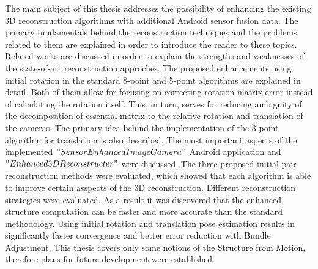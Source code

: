 


\begin{abstracts}        %

The main subject of this thesis addresses the possibility of enhancing the existing 3D reconstruction algorithms with additional Android sensor fusion data. The primary fundamentals behind the reconstruction techniques and the problems related to them are explained in order to introduce the reader to these topics. Related works are discussed in order to explain the strengths and weaknesses of the state-of-art reconstruction approches. The proposed enhancements using initial rotation in the standard 8-point and 5-point algorithms are explained in detail. Both of them allow for focusing on correcting rotation matrix error instead of calculating the rotation itself. This, in turn, serves for reducing ambiguity of the decomposition of essential matrix to the relative rotation and translation of the cameras. The primary idea behind the implementation of the 3-point algorithm for translation is also described. The most important aspects of the implemented $"Sensor Enhanced Image Camera"$ Android application and $"Enhanced 3D Reconstructer"$ were discussed.
The three proposed initial pair reconstruction methods were evaluated, which showed that each algorithm is able to improve certain asspects of the 3D reconstruction. Different reconstruction strategies were evaluated. As a result it was discovered that the enhanced structure computation can be faster and more accurate than the standard methodology. Using initial rotation and translation pose estimation results in significantly faster convergence and better error reduction with Bundle Adjustment. This thesis covers only some notions of the Structure from Motion, therefore plans for future development were  established.

\end{abstracts}
\clearpage
\renewcommand{\abstractname}{Zusammenfassung}
